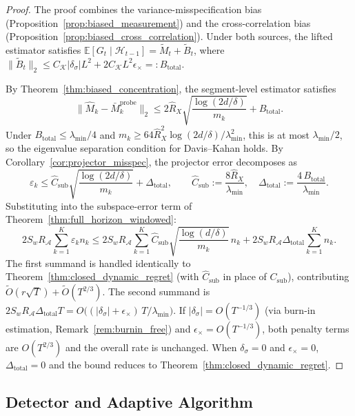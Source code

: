 \documentclass{article}
\newcommand{\E}{\mathbb{E}}
\newcommand{\cA}{\mathcal{A}}
\newcommand{\cH}{\mathcal{H}}
\begin{document}
\begin{proof}
The proof combines the variance-misspecification bias (Proposition~\ref{prop:biased_measurement}) and the cross-correlation bias (Proposition~\ref{prop:biased_cross_correlation}).
Under both sources, the lifted estimator satisfies $\E[G_t \mid \cH_{t-1}] = \widetilde M_t + \widetilde B_t$, where $\|\widetilde B_t\|_2 \le C_{\mathcal K}|\delta_\sigma|L^2 + 2C_{\mathcal K}L^2\epsilon_\times =: B_{\mathrm{total}}$.

By Theorem~\ref{thm:biased_concentration}, the segment-level estimator satisfies
\[
\|\widehat M_k - \bar M_k^{\mathrm{probe}}\|_2 \le 2\hat R_X\sqrt{\frac{\log(2d/\delta)}{m_k}} + B_{\mathrm{total}}.
\]
Under $B_{\mathrm{total}} \le \lambda_{\min}/4$ and $m_k \ge 64\hat R_X^2\log(2d/\delta)/\lambda_{\min}^2$, this is at most $\lambda_{\min}/2$, so the eigenvalue separation condition for Davis--Kahan holds.
By Corollary~\ref{cor:projector_misspec}, the projector error decomposes as
\[
\varepsilon_k \le \hat C_{\mathrm{sub}}\sqrt{\frac{\log(2d/\delta)}{m_k}} + \Delta_{\mathrm{total}}, \qquad \hat C_{\mathrm{sub}} := \frac{8\hat R_X}{\lambda_{\min}}, \quad \Delta_{\mathrm{total}} := \frac{4\,B_{\mathrm{total}}}{\lambda_{\min}}.
\]
Substituting into the subspace-error term of Theorem~\ref{thm:full_horizon_windowed}:
\[
2S_wR_{\cA}\sum_{k=1}^K\varepsilon_k n_k \le 2S_wR_{\cA}\sum_{k=1}^K \hat C_{\mathrm{sub}}\sqrt{\frac{\log(d/\delta)}{m_k}}\,n_k + 2S_wR_{\cA}\Delta_{\mathrm{total}} \sum_{k=1}^K n_k.
\]
The first summand is handled identically to Theorem~\ref{thm:closed_dynamic_regret} (with $\hat C_{\mathrm{sub}}$ in place of $C_{\mathrm{sub}}$), contributing $\widetilde O(r\sqrt{T}) + \widetilde O(T^{2/3})$.
The second summand is $2S_wR_{\cA}\Delta_{\mathrm{total}} T = O\bigl((|\delta_\sigma| + \epsilon_\times)\,T/\lambda_{\min}\bigr)$.
If $|\delta_\sigma| = O(T^{-1/3})$ (via burn-in estimation, Remark~\ref{rem:burnin_free}) and $\epsilon_\times = O(T^{-1/3})$, both penalty terms are $O(T^{2/3})$ and the overall rate is unchanged.
When $\delta_\sigma = 0$ and $\epsilon_\times = 0$, $\Delta_{\mathrm{total}} = 0$ and the bound reduces to Theorem~\ref{thm:closed_dynamic_regret}.
\end{proof}

\subsection{Detector and Adaptive Algorithm}
\end{document}
